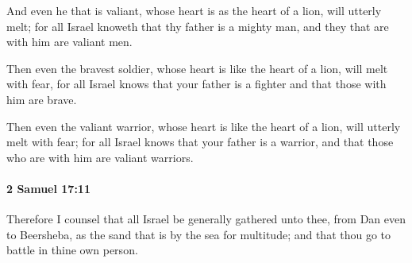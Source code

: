 			\begin{versebox}
					\item[BHS] 
					\item[ASV] And even he that is valiant, whose heart is as the heart of a lion, will utterly melt; for all Israel knoweth that thy father is a mighty man, and they that are with him are valiant men.
					\item[NIV] Then even the bravest soldier, whose heart is like the heart of a lion, will melt with fear, for all Israel knows that your father is a fighter and that those with him are brave.
					\item[NRSV] Then even the valiant warrior, whose heart is like the heart of a lion, will utterly melt with fear; for all Israel knows that your father is a warrior, and that those who are with him are valiant warriors.
			\end{versebox}

		\paragraph{2 Samuel 17:11} %
			\label{2SAMUEL-17-11}

			Therefore I counsel that all Israel be generally gathered unto thee, from Dan even to Beersheba, as the sand that is by the sea for multitude; and that thou go to battle in thine own person.

